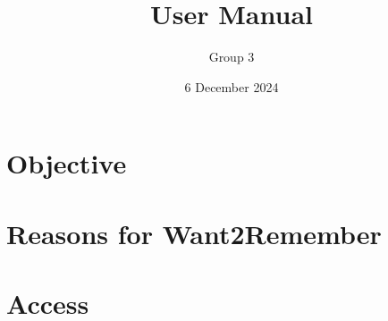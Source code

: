 \documentclass{article}
\title{User Manual}
\author{Group 3}
\date{6 December 2024}
\begin{document}
\maketitle
\newpage

\tableofcontents
\newpage

\section{Objective}

\section{Reasons for Want2Remember}

\section{Access}
\end{document}
